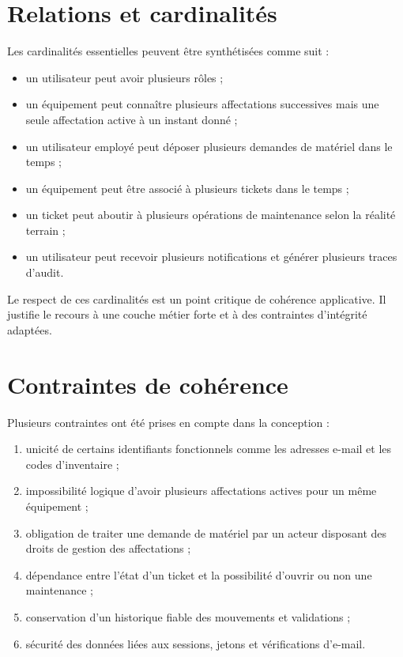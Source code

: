 ﻿\documentclass[12pt,a4paper,oneside]{report}
\begin{document}
\section{Relations et cardinalités}
Les cardinalités essentielles peuvent être synthétisées comme suit :
\begin{itemize}
  \item un utilisateur peut avoir plusieurs rôles ;
  \item un équipement peut connaître plusieurs affectations successives mais une seule affectation active à un instant donné ;
  \item un utilisateur employé peut déposer plusieurs demandes de matériel dans le temps ;
  \item un équipement peut être associé à plusieurs tickets dans le temps ;
  \item un ticket peut aboutir à plusieurs opérations de maintenance selon la réalité terrain ;
  \item un utilisateur peut recevoir plusieurs notifications et générer plusieurs traces d'audit.
\end{itemize}

Le respect de ces cardinalités est un point critique de cohérence applicative. Il justifie le recours à une couche métier forte et à des contraintes d'intégrité adaptées.

\section{Contraintes de cohérence}
Plusieurs contraintes ont été prises en compte dans la conception :
\begin{enumerate}
  \item unicité de certains identifiants fonctionnels comme les adresses e-mail et les codes d'inventaire ;
  \item impossibilité logique d'avoir plusieurs affectations actives pour un même équipement ;
  \item obligation de traiter une demande de matériel par un acteur disposant des droits de gestion des affectations ;
  \item dépendance entre l'état d'un ticket et la possibilité d'ouvrir ou non une maintenance ;
  \item conservation d'un historique fiable des mouvements et validations ;
  \item sécurité des données liées aux sessions, jetons et vérifications d'e-mail.
\end{enumerate}
\end{document}
